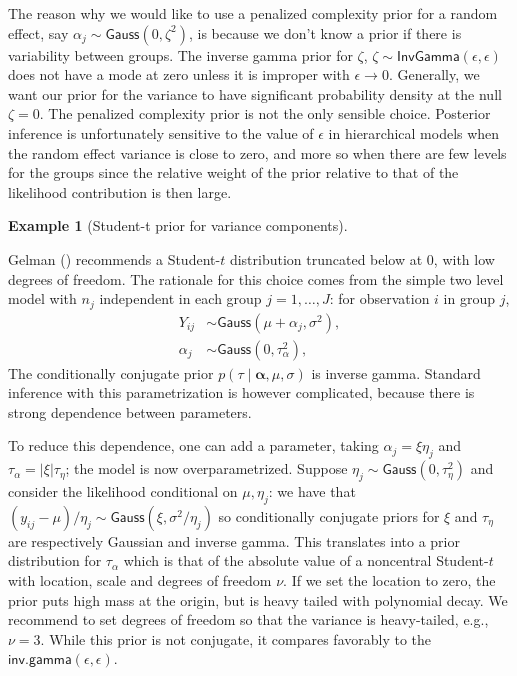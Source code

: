 \documentclass[
  11pt,
  letterpaper,
]{scrbook}
\theoremstyle{definition}
\theoremstyle{definition}
\newtheorem{example}{Example}[chapter]
\theoremstyle{definition}
\theoremstyle{plain}
\theoremstyle{plain}
\theoremstyle{remark}
\begin{document}
The reason why we would like to use a penalized complexity prior for a
random effect, say \(\alpha_j \sim \mathsf{Gauss}(0, \zeta^2)\), is
because we don't know a prior if there is variability between groups.
The inverse gamma prior for \(\zeta\),
\(\zeta \sim \mathsf{InvGamma}(\epsilon, \epsilon)\) does not have a
mode at zero unless it is improper with \(\epsilon \to 0\). Generally,
we want our prior for the variance to have significant probability
density at the null \(\zeta=0\). The penalized complexity prior is not
the only sensible choice. Posterior inference is unfortunately sensitive
to the value of \(\epsilon\) in hierarchical models when the random
effect variance is close to zero, and more so when there are few levels
for the groups since the relative weight of the prior relative to that
of the likelihood contribution is then large.

\begin{example}[Student-t prior for variance
components]\protect\hypertarget{exm-random-effect-variance}{}\label{exm-random-effect-variance}

Gelman () recommends a Student-\(t\)
distribution truncated below at \(0\), with low degrees of freedom. The
rationale for this choice comes from the simple two level model with
\(n_j\) independent in each group \(j=1, \ldots, J\): for observation
\(i\) in group \(j\), \begin{align*}
Y_{ij} &\sim \mathsf{Gauss}(\mu + \alpha_j, \sigma^2),\\
\alpha_j &\sim \mathsf{Gauss}(0, \tau^2_\alpha),
\end{align*} The conditionally conjugate prior
\(p(\tau \mid \boldsymbol{\alpha}, \mu, \sigma)\) is inverse gamma.
Standard inference with this parametrization is however complicated,
because there is strong dependence between parameters.

To reduce this dependence, one can add a parameter, taking
\(\alpha_j = \xi \eta_j\) and \(\tau_\alpha=|\xi|\tau_{\eta}\); the
model is now overparametrized. Suppose
\(\eta_j \sim \mathsf{Gauss}(0, \tau^2_\eta)\) and consider the
likelihood conditional on \(\mu, \eta_j\): we have that
\((y_{ij} - \mu)/\eta_j \sim \mathsf{Gauss}(\xi, \sigma^2/\eta_j)\) so
conditionally conjugate priors for \(\xi\) and \(\tau_\eta\) are
respectively Gaussian and inverse gamma. This translates into a prior
distribution for \(\tau_\alpha\) which is that of the absolute value of
a noncentral Student-\(t\) with location, scale and degrees of freedom
\(\nu\). If we set the location to zero, the prior puts high mass at the
origin, but is heavy tailed with polynomial decay. We recommend to set
degrees of freedom so that the variance is heavy-tailed, e.g.,
\(\nu=3\). While this prior is not conjugate, it compares favorably to
the \(\mathsf{inv. gamma}(\epsilon, \epsilon)\).

\end{example}
\end{document}
